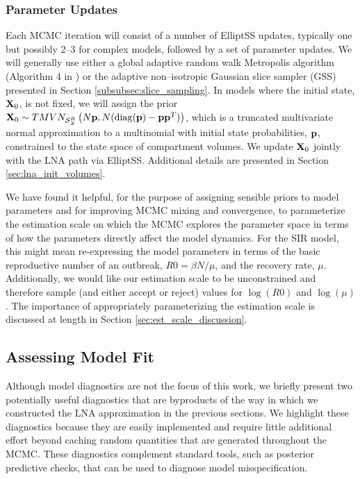 \subsubsection{Parameter Updates}
\label{subsubsec:lna_param_updates}
Each MCMC iteration will consist of a number of ElliptSS updates, typically one but possibly 2--3 for complex models, followed by a set of parameter updates. We will generally use either a global adaptive random walk Metropolis algorithm (Algorithm 4 in \cite{andrieu2008tutorial}) or the adaptive non--isotropic Gaussian slice sampler (GSS) presented in Section \ref{subsubsec:slice_sampling}. In models where the initial state, $ \mathbf{X}_0 $, is not fixed, we will assign the prior $ \mathbf{X}_0 \sim TMVN_{\mathcal{S}_X^R}\left (N\mathbf{p}, N(\mathrm{diag}(\mathbf{p}) - \mathbf{p}\mathbf{p}^T)\right ) $, which is a truncated multivariate normal approximation to a multinomial with initial state probabilities, $ \mathbf{p} $, constrained to the state space of compartment volumes. We update $ \mathbf{X}_0 $ jointly with the LNA path via ElliptSS. Additional details are presented in Section \ref{sec:lna_init_volumes}.

We have found it helpful, for the purpose of assigning sensible priors to model parameters and for improving MCMC mixing and convergence, to parameterize the estimation scale on which the MCMC explores the parameter space in terms of how the parameters directly affect the model dynamics. For the SIR model, this might mean re-expressing the model parameters in terms of the basic reproductive number of an outbreak, $ R0 = \beta N /\mu $, and the recovery rate, $ \mu $. Additionally, we would like our estimation scale to be unconstrained and therefore sample (and either accept or reject) values for $ \log(R0) $ and $ \log(\mu) $. The importance of appropriately parameterizing the estimation scale is discussed at length in Section \ref{sec:est_scale_discussion}. 

\subsection{Assessing Model Fit}
\label{subsec:lna_model_diags}

Although model diagnostics are not the focus of this work, we briefly present two potentially useful diagnostics that are byproducts of the way in which we constructed the LNA approximation in the previous sections. We highlight these diagnostics because they are easily implemented and require little additional effort beyond caching random quantities that are generated throughout the MCMC. These diagnostics complement standard tools, such as posterior predictive checks, that can be used to diagnose model misspecification. 

